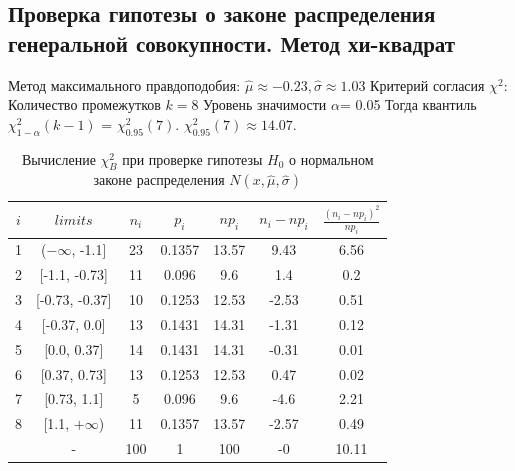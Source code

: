 \subsection{Проверка гипотезы о законе распределения генеральной совокупности. Метод хи-квадрат}

\noindent Метод максимального правдоподобия:
\newline
$\hat{\mu} \approx -0.23, \hat{\sigma} \approx 1.03$
\newline
Критерий согласия $\chi^{2}$:
\newline
Количество промежутков $k = 8$
\newline
Уровень значимости $\alpha$= 0.05
\newline
Тогда квантиль $\chi^{2}_{1-\alpha}(k-1)$ = $\chi^{2}_{0.95}(7)$. $\chi^{2}_{0.95}(7) \approx 14.07$. 
\begin{table}[H]
	\centering
	\begin{tabular}{| c | c | c | c | c | c | c |}
		\hline
		$i$ & $limits$         &   $n_i$ &    $p_i$ &   $np_i$ &   $n_i - np_i$ &   $\frac{(n_i-np_i)^2}{np_i}$ \\
		\hline
		1 & ($-\infty$, -1.1] &    23 & 0.1357 &  13.57 &         9.43 &                        6.56 \\
		2 & [-1.1, -0.73]  &    11 & 0.096  &   9.6  &         1.4  &                        0.2  \\
		3 & [-0.73, -0.37] &    10 & 0.1253 &  12.53 &        -2.53 &                        0.51 \\
		4 & [-0.37, 0.0]   &    13 & 0.1431 &  14.31 &        -1.31 &                        0.12 \\
		5 & [0.0, 0.37]    &    14 & 0.1431 &  14.31 &        -0.31 &                        0.01 \\
		6 & [0.37, 0.73]   &    13 & 0.1253 &  12.53 &         0.47 &                        0.02 \\
		7 & [0.73, 1.1]    &     5 & 0.096  &   9.6  &        -4.6  &                        2.21 \\
		8 & [1.1, $+\infty$)   &    11 & 0.1357 &  13.57 &        -2.57 &                        0.49 \\
		\sum & -              &   100 & 1      & 100    &        -0    &                       10.11 \\
		\hline
	\end{tabular}
	\caption{ Вычисление $\chi^{2}_{B}$ при проверке гипотезы $H_{0}$ о нормальном законе распределения $N(x,\hat{\mu}, \hat{\sigma})$}
	\label{tab:normal_chi_2}
\end{table} 

